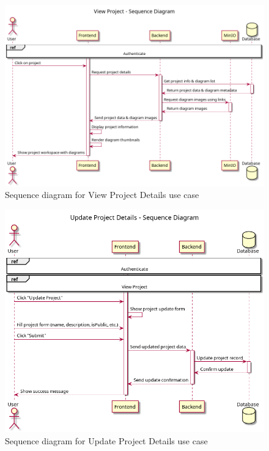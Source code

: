 \begin{figure}[H]
\centering
\includegraphics[width=\textwidth]{conception/SprintIII/sequence_diagrams/sequence_projectManagement_3_2_ViewProjectDetails.png}
\caption{Sequence diagram for View Project Details use case}
\label{fig:seq_view_project}
\end{figure}

\begin{figure}[H]
\centering
\includegraphics[width=\textwidth]{conception/SprintIII/sequence_diagrams/sequence_projectManagement_3_3_UpdateProjectDetails.png}
\caption{Sequence diagram for Update Project Details use case}
\label{fig:seq_update_project}
\end{figure}

